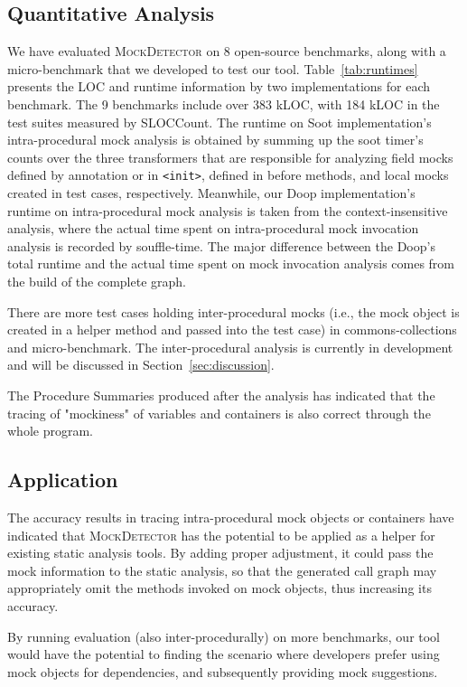 \subsection{Quantitative Analysis}
\label{subsec:effectiveness}

We have evaluated \textsc{MockDetector} on 8 open-source benchmarks, along with a micro-benchmark that we developed to test our tool. Table~\ref{tab:runtimes} presents the LOC and runtime information by two implementations for each benchmark. The 9 benchmarks include over 383 kLOC, with 184 kLOC in the test suites measured by SLOCCount. The runtime on Soot implementation's intra-procedural mock analysis is obtained by summing up the soot timer's counts over the three transformers that are responsible for analyzing field mocks defined by annotation or in \texttt{<init>}, defined in before methods, and local mocks created in test cases, respectively. Meanwhile, our Doop implementation's runtime on intra-procedural mock analysis is taken from the context-insensitive analysis, where the actual time spent on intra-procedural mock invocation analysis is recorded by souffle-time. The major difference between the Doop's total runtime and the actual time spent on mock invocation analysis comes from the build of the complete graph. %

There are more test cases holding inter-procedural mocks (i.e., the mock object is created in a helper method and passed into the test case) in commons-collections and micro-benchmark. The inter-procedural analysis is currently in development and will be discussed in Section~\ref{sec:discussion}.

The Procedure Summaries produced after the analysis has indicated that the tracing of "mockiness" of variables and containers is also correct through the whole program. 

\subsection{Application}
\label{subsec:static}

The accuracy results in tracing intra-procedural mock objects or containers have indicated that \textsc{MockDetector} has the potential to be applied as a helper for existing static analysis tools. By adding proper adjustment, it could pass the mock information to the static analysis, so that the generated call graph may appropriately omit the methods invoked on mock objects, thus increasing its accuracy.

By running evaluation (also inter-procedurally) on more benchmarks, our tool would have the potential to finding the scenario where developers prefer using mock objects for dependencies, and subsequently providing mock suggestions.
